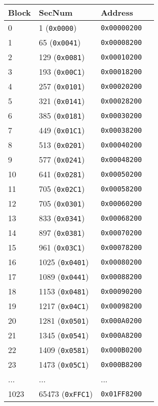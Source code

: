     \begin{tabular}{ |m{1.3cm}m{3.3cm}m{2.2cm}|>{\raggedleft\arraybackslash}m{2cm}| }
        \hline
        \rowcolor{lightgray}
        Block & SecNum & Address \\
        \hline
        \hline
        0    & 1     (\texttt{0x0000}) & \texttt{0x00000200} \\
        1    & 65    (\texttt{0x0041}) & \texttt{0x00008200} \\
        2    & 129   (\texttt{0x0081}) & \texttt{0x00010200} \\
        3    & 193   (\texttt{0x00C1}) & \texttt{0x00018200} \\
        4    & 257   (\texttt{0x0101}) & \texttt{0x00020200} \\
        5    & 321   (\texttt{0x0141}) & \texttt{0x00028200} \\
        6    & 385   (\texttt{0x0181}) & \texttt{0x00030200} \\
        7    & 449   (\texttt{0x01C1}) & \texttt{0x00038200} \\
        8    & 513   (\texttt{0x0201}) & \texttt{0x00040200} \\
        9    & 577   (\texttt{0x0241}) & \texttt{0x00048200} \\
        10   & 641   (\texttt{0x0281}) & \texttt{0x00050200} \\
        11   & 705   (\texttt{0x02C1}) & \texttt{0x00058200} \\
        12   & 705   (\texttt{0x0301}) & \texttt{0x00060200} \\
        13   & 833   (\texttt{0x0341}) & \texttt{0x00068200} \\
        14   & 897   (\texttt{0x0381}) & \texttt{0x00070200} \\
        15   & 961   (\texttt{0x03C1}) & \texttt{0x00078200} \\
        16   & 1025  (\texttt{0x0401}) & \texttt{0x00080200} \\
        17   & 1089  (\texttt{0x0441}) & \texttt{0x00088200} \\
        18   & 1153  (\texttt{0x0481}) & \texttt{0x00090200} \\
        19   & 1217  (\texttt{0x04C1}) & \texttt{0x00098200} \\
        20   & 1281  (\texttt{0x0501}) & \texttt{0x000A0200} \\
        21   & 1345  (\texttt{0x0541}) & \texttt{0x000A8200} \\
        22   & 1409  (\texttt{0x0581}) & \texttt{0x000B0200} \\
        23   & 1473  (\texttt{0x05C1}) & \texttt{0x000B8200} \\
        ...  & ...                     & ...                 \\
        1023 & 65473 (\texttt{0xFFC1}) & \texttt{0x01FF8200} \\
        \hline
    \end{tabular}